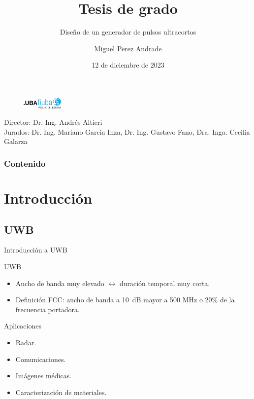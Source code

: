 \documentclass{beamer}
\author{Miguel Perez Andrade}
\title{Tesis de grado}
\subtitle{Diseño de un generador de pulsos ultracortos}
\date{12 de diciembre de 2023}
\institute{Facultad de Ingeniería de la Universidad de Buenos Aires}
\begin{document}
\begin{frame}
  \titlepage
  \begin{figure}
    \centering
    \includegraphics[width=2cm]{images/fiuba_logo.jpg}
  \end{figure}
  \begin{block}{}
    \centering
    \small Director: Dr. Ing. Andrés Altieri \\
    Jurados: Dr. Ing. Mariano Garcia Inza, Dr. Ing. Gustavo Fano, Dra. Inga.
      Cecilia Galarza
  \end{block}
\end{frame}

\begin{frame}
\frametitle{Contenido}
\tableofcontents
\end{frame}

\section{Introducción}

\subsection{UWB}

\begin{frame}{Introducción a UWB}
  \begin{block}{UWB}
    \begin{itemize}
      \item Ancho de banda muy elevado $\leftrightarrow$ duración temporal muy
          corta.
      \item Definición FCC: ancho de banda a \qty{10}{\dB} mayor a 500 MHz o 20\% de la frecuencia portadora.
    \end{itemize}
  \end{block}
  \begin{block}{Aplicaciones}
    \begin{itemize}
      \item Radar.
      \item Comunicaciones.
      \item Imágenes médicas.
      \item Caracterización de materiales.
    \end{itemize}
  \end{block}
\end{frame}
\end{document}
